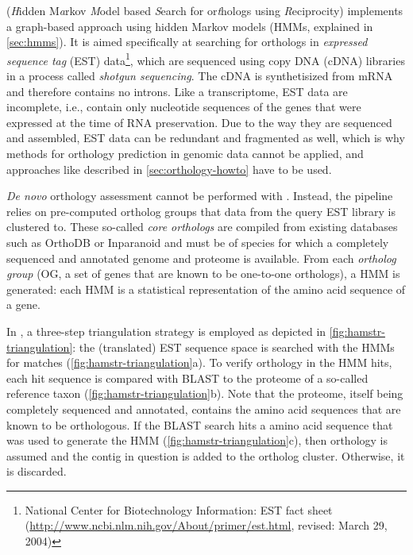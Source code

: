 \hamstr (\emph{H}idden M\emph{a}rkov \emph{M}odel based \emph{S}earch for
or\emph{t}hologs using \emph{R}eciprocity) implements a graph-based approach
using hidden Markov models (HMMs, explained in \autoref{sec:hmms}). It is aimed
specifically at searching for orthologs in \emph{expressed sequence tag} (EST)
data\footnote{National Center for Biotechnology Information: EST fact sheet
(\url{http://www.ncbi.nlm.nih.gov/About/primer/est.html}, revised: March 29,
2004)}, which are sequenced using copy DNA (cDNA) libraries in a process called
\emph{shotgun sequencing}. The cDNA is synthetisized from mRNA and therefore
contains no introns. Like a transcriptome, EST data are incomplete, i.e.,
contain only nucleotide sequences of the genes that were expressed at the time
of RNA preservation. Due to the way they are sequenced and assembled, EST data
can be redundant and fragmented as well, which is why methods for orthology
prediction in genomic data cannot be applied, and approaches like described
in \autoref{sec:orthology-howto} have to be used.

\emph{De novo} orthology assessment cannot be performed with \hamstr. Instead,
the pipeline relies on pre-computed ortholog groups that data from the query
EST library is clustered to. These so-called \emph{core orthologs} are compiled
from existing databases such as OrthoDB or Inparanoid and must be of species
for which a completely sequenced and annotated genome and proteome is
available. From each \emph{ortholog group} (OG, a set of genes that are known
to be one-to-one orthologs), a HMM is generated: each HMM is a statistical
representation of the amino acid sequence of a gene. 

In \hamstr, a three-step triangulation strategy is employed as depicted in
\autoref{fig:hamstr-triangulation}: the (translated) EST sequence space is
searched with the HMMs for matches (\autoref{fig:hamstr-triangulation}a). To
verify orthology in the HMM hits, each hit sequence is compared with BLAST
\citep{altschul1997} to the proteome of a so-called reference taxon
(\autoref{fig:hamstr-triangulation}b). Note that the proteome, itself being
completely sequenced and annotated, contains the amino acid sequences that are
known to be orthologous. If the BLAST search hits a amino acid sequence that was
used to generate the HMM (\autoref{fig:hamstr-triangulation}c), then orthology
is assumed and the contig in question is added to the ortholog cluster.
Otherwise, it is discarded.



